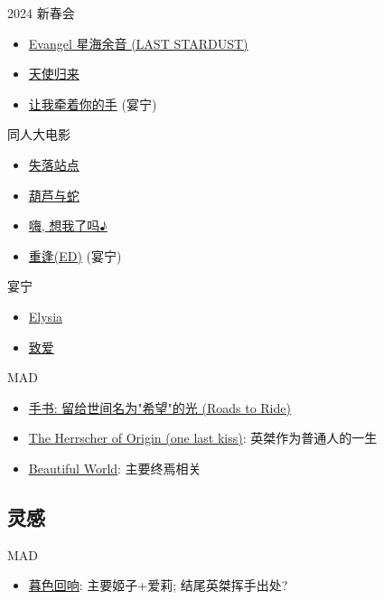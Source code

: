 \documentclass[a4paper]{article}
\begin{document}
2024 新春会

\begin{itemize}
    \item \href{https://www.bilibili.com/video/BV13c411v7DR/}{Evangel 星海余音 (LAST STARDUST)}
    \item \href{https://www.bilibili.com/video/BV1pp4y1m7Uh/}{天使归来}
    \item \href{https://www.bilibili.com/video/BV1te411h7aj/}{让我牵着你的手} (宴宁)
\end{itemize}

同人大电影

\begin{itemize}
    \item \href{https://www.bilibili.com/video/BV1Ud4y1z7mY/?t=309}{失落站点}
    \item \href{https://www.bilibili.com/video/BV1w24y1R7s9/}{葫芦与蛇}
    \item \href{https://www.bilibili.com/video/BV1LD4y117nq/}{嗨, 想我了吗♪}
    \item \href{https://www.bilibili.com/video/BV17D4y117DV/}{重逢(ED)} (宴宁)
\end{itemize}

宴宁

\begin{itemize}
    \item \href{https://www.bilibili.com/video/BV1dq4y1N7ry/}{Elysia}
    \item \href{https://www.bilibili.com/video/BV1bB4y1L7qh/}{致爱}
\end{itemize}

MAD

\begin{itemize}
    \item \href{https://www.bilibili.com/video/BV1cG41157Jx/}{手书: 留给世间名为"希望"的光 (Roads to Ride)}
    \item \href{https://www.bilibili.com/video/BV1nV4y1g7ti/}{The Herrscher of Origin (one last kiss)}: 英桀作为普通人的一生
    \item \href{https://www.bilibili.com/video/BV1XX4y1o7yN/}{Beautiful World}: 主要终焉相关
\end{itemize}

\subsection{灵感}

MAD

\begin{itemize}
    \item \href{https://www.bilibili.com/video/BV19E421c7gF/}{暮色回响}: 主要姬子+爱莉; 结尾英桀挥手出处?
\end{itemize}
\end{document}

